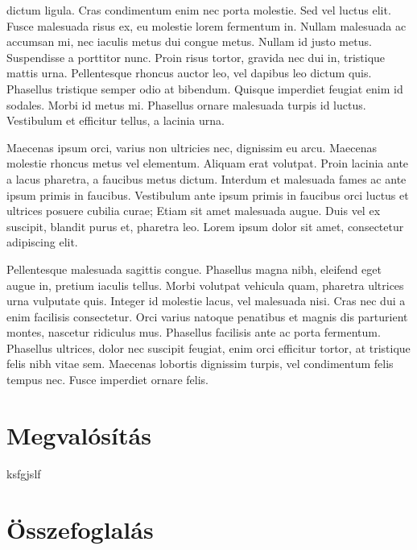 \documentclass[a4paper,12pt,oneside]{report}
\begin{document}
dictum ligula. Cras condimentum enim nec porta molestie. Sed vel luctus elit.
Fusce malesuada risus ex, eu molestie lorem fermentum in. Nullam malesuada ac
accumsan mi, nec iaculis metus dui congue metus. Nullam id justo metus.
Suspendisse a porttitor nunc. Proin risus tortor, gravida nec dui in, tristique
mattis urna. Pellentesque rhoncus auctor leo, vel dapibus leo dictum quis.
Phasellus tristique semper odio at bibendum. Quisque imperdiet feugiat enim id
sodales. Morbi id metus mi. Phasellus ornare malesuada turpis id luctus.
Vestibulum et efficitur tellus, a lacinia urna.

Maecenas ipsum orci, varius non ultricies nec, dignissim eu arcu. Maecenas
molestie rhoncus metus vel elementum. Aliquam erat volutpat. Proin lacinia ante
a lacus pharetra, a faucibus metus dictum. Interdum et malesuada fames ac ante
ipsum primis in faucibus. Vestibulum ante ipsum primis in faucibus orci luctus
et ultrices posuere cubilia curae; Etiam sit amet malesuada augue. Duis vel ex
suscipit, blandit purus et, pharetra leo. Lorem ipsum dolor sit amet,
consectetur adipiscing elit.

Pellentesque malesuada sagittis congue. Phasellus magna nibh, eleifend eget
augue in, pretium iaculis tellus. Morbi volutpat vehicula quam, pharetra
ultrices urna vulputate quis. Integer id molestie lacus, vel malesuada nisi.
Cras nec dui a enim facilisis consectetur. Orci varius natoque penatibus et
magnis dis parturient montes, nascetur ridiculus mus. Phasellus facilisis ante
ac porta fermentum. Phasellus ultrices, dolor nec suscipit feugiat, enim orci
efficitur tortor, at tristique felis nibh vitae sem. Maecenas lobortis
dignissim turpis, vel condimentum felis tempus nec. Fusce imperdiet ornare
felis.

\chapter{Megvalósítás}

ksfgjslf

\chapter{Összefoglalás}
\end{document}
